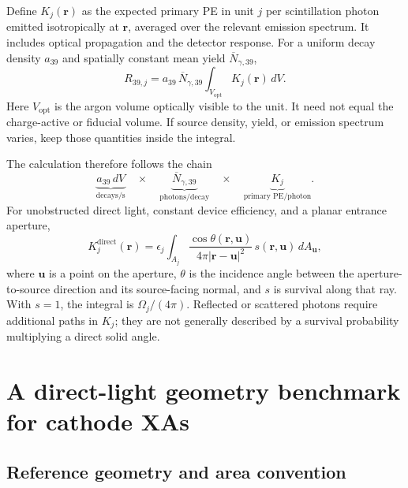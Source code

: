 \documentclass[11pt]{article}
\begin{document}
Define $K_j(\bm r)$ as the expected primary PE in unit $j$ per scintillation
photon emitted isotropically at $\bm r$, averaged over the relevant emission
spectrum. It includes optical propagation and the detector response. For a
uniform decay density $a_{39}$ and spatially constant mean yield
$\overline N_{\gamma,39}$,
\begin{equation}
\boxed{
R_{39,j}=a_{39}\,\overline N_{\gamma,39}
\int_{V_{\mathrm{opt}}}K_j(\bm r)\,dV .
}
\label{eq:master}
\end{equation}
Here $V_{\mathrm{opt}}$ is the argon volume optically visible to the unit.
It need not equal the charge-active or fiducial volume. If source density,
yield, or emission spectrum varies, keep those quantities inside the integral.

The calculation therefore follows the chain
\begin{equation*}
\underbrace{a_{39}\,dV}_{\text{decays/s}}
\quad\times\quad
\underbrace{\overline N_{\gamma,39}}_{\text{photons/decay}}
\quad\times\quad
\underbrace{K_j}_{\text{primary PE/photon}}.
\end{equation*}
For unobstructed direct light, constant device efficiency, and a planar
entrance aperture,
\begin{equation}
K_j^{\mathrm{direct}}(\bm r)
=\epsilon_j\int_{A_j}
\frac{\cos\theta(\bm r,\bm u)}{4\pi|\bm r-\bm u|^2}
\,s(\bm r,\bm u)\,dA_{\bm u},
\label{eq:directkernel}
\end{equation}
where $\bm u$ is a point on the aperture, $\theta$ is the incidence angle
between the aperture-to-source direction and its source-facing normal,
and $s$ is survival along that ray.
With $s=1$, the integral is $\Omega_j/(4\pi)$. Reflected or scattered photons
require additional paths in $K_j$; they are not generally described by a
survival probability multiplying a direct solid angle.

\section{A direct-light geometry benchmark for cathode XAs}

\subsection{Reference geometry and area convention}
\end{document}
